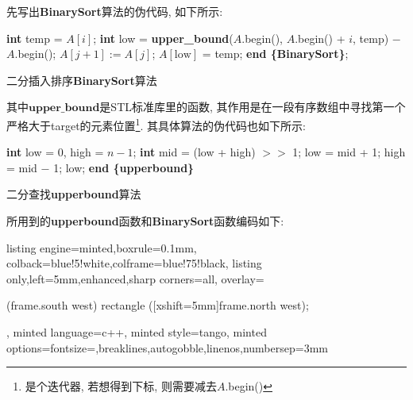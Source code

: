 \documentclass{article}
\begin{document}
\begin{homeworkProblem}
	先写出\textbf{BinarySort}算法的伪代码, 如下所示: 
	\begin{algorithm}[H]
		\begin{algorithmic}[1]
			\State \textbf{int} temp = $A[i]$; 
			\State \textbf{int} low = \textbf{upper_bound}($A$.begin(), $A$.begin() + $i$, temp) $-$ $A$.begin(); 
			 
					\State $A[j+1]:=A[j]$;
				\EndFor
				\State $A[\text{low}]$ = temp;
			\EndIf
		\EndFor
		\State \textbf{end \{BinarySort\}};
		\end{algorithmic}
		\caption{二分插入排序\textbf{BinarySort}算法}
		\label{alg:二分插入排序}
	\end{algorithm}
	其中$\textbf{upper_bound}$是STL标准库里的函数, 其作用是在一段有序数组中寻找第一个严格大于target的元素位置\footnote{是个迭代器, 若想得到下标, 则需要减去$A$.begin()}. 其具体算法的伪代码也如下所示:
	\newpage
	\begin{algorithm}[H]
		\begin{algorithmic}[1]
		\State \textbf{int} low = 0, high = $n - 1$;
			\State \textbf{int} mid = (low + high) $>>$ 1;
			 
				\State low = mid + 1;
			\Else
				\State high = mid $-$ 1;
			\EndIf
		\EndWhile
		\State \Return low; 
		\State \textbf{end \{upperbound\}}
		\end{algorithmic}
		\caption{二分查找\textbf{upperbound}算法}
		\label{alg:upperbound算法}
	\end{algorithm}
所用到的\textbf{upperbound}函数和\textbf{BinarySort}函数编码如下:
\begin{tcblisting}{listing engine=minted,boxrule=0.1mm,
colback=blue!5!white,colframe=blue!75!black,
listing only,left=5mm,enhanced,sharp corners=all,
overlay={\begin{tcbclipinterior} (frame.south west)
rectangle ([xshift=5mm]frame.north west);\end{tcbclipinterior}},
minted language=c++,
minted style=tango,
minted options={fontsize=\small,breaklines,autogobble,linenos,numbersep=3mm}}

\end{tcblisting}
\end{homeworkProblem}
\end{document}
